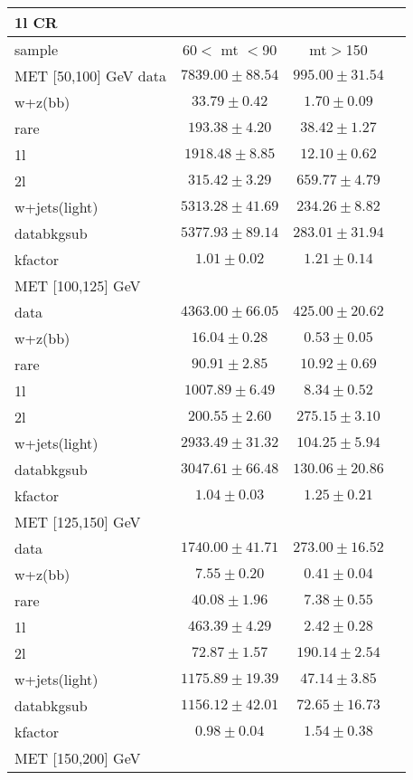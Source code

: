 \begin{table}
\begin{center}
\small
\begin{tabular}{lccc}
\hline
1l CR   & &\\
\hline
sample&60$<$ mt $<$90&mt$>$150\\
\hline
MET [50,100] GeV\hline
data&$7839.00\pm88.54$&$995.00\pm31.54$\\
\hline
w+z(bb)&$33.79\pm0.42$&$1.70\pm0.09$\\
rare&$193.38\pm4.20$&$38.42\pm1.27$\\
1l&$1918.48\pm8.85$&$12.10\pm0.62$\\
2l&$315.42\pm3.29$&$659.77\pm4.79$\\
w+jets(light)&$5313.28\pm41.69$&$234.26\pm8.82$\\
\hline
databkgsub&$5377.93\pm89.14$&$283.01\pm31.94$\\
kfactor&$1.01\pm0.02$&$1.21\pm0.14$\\
\hline\hline
\hline
MET [100,125] GeV  & &\\
\hline
data&$4363.00\pm66.05$&$425.00\pm20.62$\\
\hline
w+z(bb)&$16.04\pm0.28$&$0.53\pm0.05$\\
rare&$90.91\pm2.85$&$10.92\pm0.69$\\
1l&$1007.89\pm6.49$&$8.34\pm0.52$\\
2l&$200.55\pm2.60$&$275.15\pm3.10$\\
w+jets(light)&$2933.49\pm31.32$&$104.25\pm5.94$\\
\hline
databkgsub&$3047.61\pm66.48$&$130.06\pm20.86$\\
kfactor&$1.04\pm0.03$&$1.25\pm0.21$\\
\hline\hline
\hline
MET [125,150] GeV  & &\\
\hline
data&$1740.00\pm41.71$&$273.00\pm16.52$\\
\hline
w+z(bb)&$7.55\pm0.20$&$0.41\pm0.04$\\
rare&$40.08\pm1.96$&$7.38\pm0.55$\\
1l&$463.39\pm4.29$&$2.42\pm0.28$\\
2l&$72.87\pm1.57$&$190.14\pm2.54$\\
w+jets(light)&$1175.89\pm19.39$&$47.14\pm3.85$\\
\hline
databkgsub&$1156.12\pm42.01$&$72.65\pm16.73$\\
kfactor&$0.98\pm0.04$&$1.54\pm0.38$\\
\hline\hline
\hline
MET [150,200] GeV   & &\\

\end{tabular}
\end{center}
\end{table}
